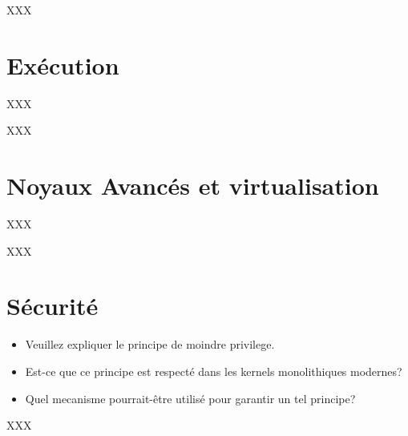 \begin{correction}

XXX

\end{correction}

%
%

\section{Ex\'ecution
         {\hfill{} }}

XXX

\begin{correction}

XXX

\end{correction}

%
%

\section{Noyaux Avanc\'es et virtualisation
         }

XXX

\begin{correction}

XXX

\end{correction}

% 
%

\section{S\'ecurit\'e
         }


\begin{itemize}
  \item
    Veuillez expliquer le principe de moindre privilege.
  \item
    Est-ce que ce principe est respect\'e dans les kernels monolithiques
    modernes?
  \item
    Quel mecanisme pourrait-\^etre utilis\'e pour garantir un tel principe?
\end{itemize}

\begin{correction}

XXX

\end{correction}

%
%

